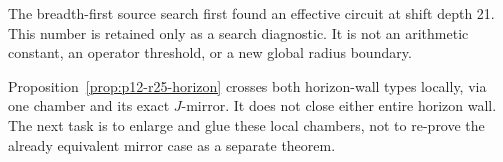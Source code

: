 \begin{remark}
The breadth-first source search first found an effective circuit at shift depth
21. This number is retained only as a search diagnostic. It is not an
arithmetic constant, an operator threshold, or a new global radius boundary.
\end{remark}

\begin{remark}
Proposition~\ref{prop:p12-r25-horizon} crosses both horizon-wall types locally,
via one chamber and its exact \(J\)-mirror. It does not close either entire
horizon wall. The next task is to enlarge and glue these local chambers, not to
re-prove the already equivalent mirror case as a separate theorem.
\end{remark}
